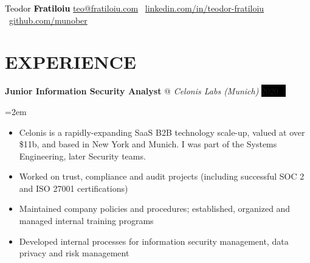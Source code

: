 \documentclass[paper=a4,fontsize=11pt]{scrartcl}
\makeatletter
\newlength{\spacebox}
\newcommand{\sepspace}{\vspace*{0.45em}}		%
\newcommand{\MyName}[1]{ %
                \huge 
                #1 \hfill 
                \par \normalsize \normalfont}
\newcommand{\MySlogan}[1]{ %
		\Large 
		\text{#1} \hfill
		\par \normalsize \normalfont}
\newcommand{\NewPart}[1]{\section*{\uppercase{#1}}}
\newcommand{\PersonalEntry}[2]{
		\noindent\hangindent=2em\hangafter=0 %
		\parbox{\spacebox}{        %
		\textit{#1}}		       %
		\hspace{1.5em} #2 \par}    %
\newcommand{\EducationEntry}[4]{
		\noindent \textit{#1} \hfill      %
		\colorbox{black}{\color{white}#2} \par  %
		\noindent\hangindent=2em\hangafter=0 \small #3 %
		\normalsize \par}
\newcommand{\WorkEntry}[4]{				  %
		\noindent \textbf{#1} @ \textit{#3} \hfill      %
		\colorbox{black}{\color{white}#2} \par  %
		\noindent\hangindent=2em\hangafter=0 \small #4 %
		\normalsize \par}
\makeatother
\begin{document}





\begin{adjustwidth}{-0.9in}{}
     	\textcolor{black}{
	\parbox[b][2.5cm][c]{21cm}{%
            \huge 
            \centering
            \vspace*{1cm}
            \hspace*{3.5cm}Teodor \textbf{Fratiloiu}
            \large
            \newline
            \href{mailto:teo@fratiloiu.com}{teo@fratiloiu.com} \textbar\
            \href{https://www.linkedin.com/in/teodor-fratiloiu/}{linkedin.com/in/teodor-fratiloiu}  \textbar\
            \href{https://github.com/munober}{github.com/munober} 
        }
}

\end{adjustwidth}

\NewPart{Experience}{}

\WorkEntry{Junior Information Security Analyst}{2020 – }{Celonis Labs (Munich)}
{
\begin{itemize}
  \item Celonis is a rapidly-expanding SaaS B2B technology scale-up, valued at over \$11b, and based in New York and Munich. I was part of the Systems Engineering, later Security teams.
  \item Worked on trust, compliance and audit projects (including successful SOC 2 and ISO 27001 certifications)
  \item Maintained company policies and procedures; established, organized and managed internal training programs
  \item Developed internal processes for information security management, data privacy and risk management
\end{itemize}
}
\sepspace
\end{document}

